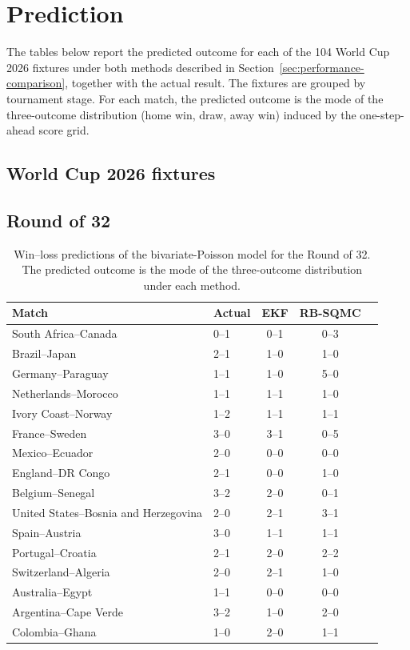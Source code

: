 \chapter{Prediction}
\label{app:prediction}

The tables below report the predicted outcome for each of the 104 World Cup 2026 fixtures under both methods described in Section~\ref{sec:performance-comparison}, together with the actual result. The fixtures are grouped by tournament stage. For each match, the predicted outcome is the mode of the three-outcome distribution (home win, draw, away win) induced by the one-step-ahead score grid.

\section{World Cup 2026 fixtures}
\label{app:prediction-fixtures}

\section{Round of 32}

\begin{table}[H]
\centering
\begin{tabular}{llccc}
\toprule
Match & Actual & EKF & RB-SQMC \\
\midrule
South Africa--Canada & 0--1 & 0--1 & 0--3 \\
Brazil--Japan & 2--1 & 1--0 & 1--0 \\
Germany--Paraguay & 1--1 & 1--0 & 5--0 \\
Netherlands--Morocco & 1--1 & 1--1 & 1--0 \\
Ivory Coast--Norway & 1--2 & 1--1 & 1--1 \\
France--Sweden & 3--0 & 3--1 & 0--5 \\
Mexico--Ecuador & 2--0 & 0--0 & 0--0 \\
England--DR Congo & 2--1 & 0--0 & 1--0 \\
Belgium--Senegal & 3--2 & 2--0 & 0--1 \\
United States--Bosnia and Herzegovina & 2--0 & 2--1 & 3--1 \\
Spain--Austria & 3--0 & 1--1 & 1--1 \\
Portugal--Croatia & 2--1 & 2--0 & 2--2 \\
Switzerland--Algeria & 2--0 & 2--1 & 1--0 \\
Australia--Egypt & 1--1 & 0--0 & 0--0 \\
Argentina--Cape Verde & 3--2 & 1--0 & 2--0 \\
Colombia--Ghana & 1--0 & 2--0 & 1--1 \\
\bottomrule
\end{tabular}
\caption{Win--loss predictions of the bivariate-Poisson model for the Round of 32. The predicted outcome is the mode of the three-outcome distribution under each method.}
\end{table}

